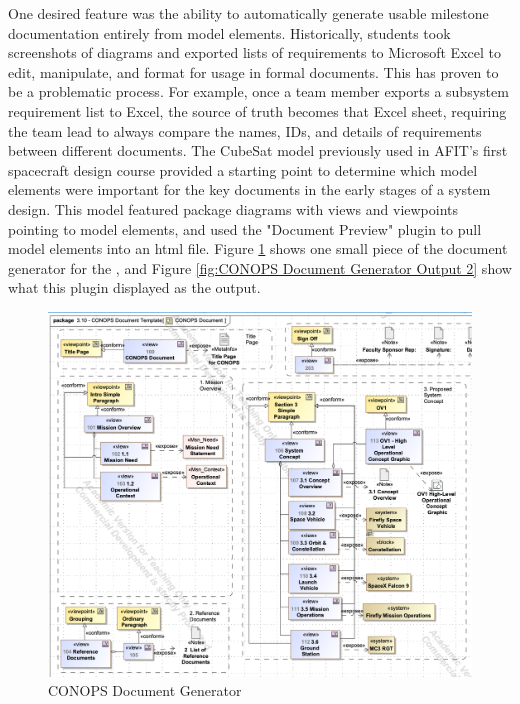 One desired feature was the ability to automatically generate usable milestone documentation entirely from model elements. Historically, students took screenshots of diagrams and exported lists of requirements to Microsoft Excel to edit, manipulate, and format for usage in formal documents. This has proven to be a problematic process. For example, once a team member exports a subsystem requirement list to Excel, the source of truth becomes that Excel sheet, requiring the team lead to always compare the names, IDs, and details of requirements between different documents. The CubeSat model previously used in AFIT's first spacecraft design course provided a starting point to determine which model elements were important for the key documents in the early stages of a system design. This model featured package diagrams with views and viewpoints pointing to model elements, and used the "Document Preview" plugin to pull model elements into an html file. Figure \ref{fig:CONOPS Document Generator} shows one small piece of the document generator for the , and Figure \ref{fig:CONOPS Document Generator Output 2} show what this plugin displayed as the output. 

\begin{figure}[H]
    \centering
    \includegraphics[width=\textwidth]{Thesis/Literature_Review/Lit Review Figures/ayres document generator.png}
    \caption{CONOPS Document Generator}
    \label{fig:CONOPS Document Generator}
\end{figure}

